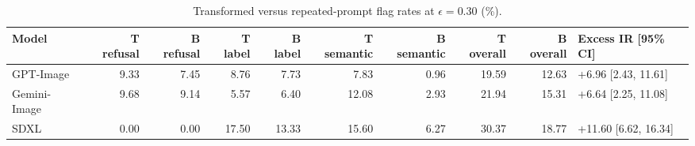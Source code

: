 \begin{table}[t]
\centering
\caption{Transformed versus repeated-prompt flag rates at $\epsilon=0.30$ (\%).}
\label{tab:repeated-generation}
\begin{tabular}{lrrrrrrrrl}
\toprule
Model & T refusal & B refusal & T label & B label & T semantic & B semantic & T overall & B overall & Excess IR [95\% CI] \\
\midrule
GPT-Image & 9.33 & 7.45 & 8.76 & 7.73 & 7.83 & 0.96 & 19.59 & 12.63 & +6.96 [2.43, 11.61] \\
Gemini-Image & 9.68 & 9.14 & 5.57 & 6.40 & 12.08 & 2.93 & 21.94 & 15.31 & +6.64 [2.25, 11.08] \\
SDXL & 0.00 & 0.00 & 17.50 & 13.33 & 15.60 & 6.27 & 30.37 & 18.77 & +11.60 [6.62, 16.34] \\
\bottomrule
\end{tabular}
\end{table}
